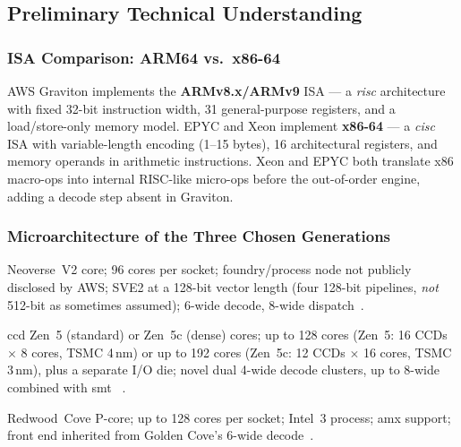 \documentclass[12pt,a4paper]{article}
\begin{document}
\subsection{Preliminary Technical Understanding}
\label{sec:tech}

\subsubsection*{ISA Comparison: ARM64 vs.\ x86-64}
AWS Graviton implements the \textbf{ARMv8.x/ARMv9} ISA --- a
\emph{\gls{risc}} architecture with fixed 32-bit
instruction width, 31 general-purpose registers, and a load/store-only
memory model. EPYC and Xeon implement \textbf{x86-64} --- a
\emph{\gls{cisc}} ISA with variable-length encoding (1--15
bytes), 16 architectural registers, and memory operands in arithmetic
instructions. Xeon and EPYC both translate x86 macro-ops into internal
RISC-like micro-ops before the out-of-order engine, adding a decode
step absent in Graviton.

\subsubsection*{Microarchitecture of the Three Chosen Generations}
\begin{description}[leftmargin=2em, itemsep=3pt]
  \item[AWS Graviton4 (2024)] Neoverse~V2 core; 96 cores per socket;
        foundry/process node not publicly disclosed by AWS; SVE2 at a
        128-bit vector length (four 128-bit pipelines, \emph{not} 512-bit
        as sometimes assumed); 6-wide decode, 8-wide
        dispatch~\cite{chipsandcheese_graviton4}.
  \item[AMD EPYC 9005 ``Turin'' (2024)] \gls{ccd}
        Zen~5 (standard) or Zen~5c (dense) cores; up to 128 cores
        (Zen~5: 16 CCDs $\times$ 8 cores, TSMC 4\,nm) or up to 192
        cores (Zen~5c: 12 CCDs $\times$ 16 cores, TSMC 3\,nm), plus a
        separate I/O die; novel dual 4-wide decode clusters, up to
        8-wide combined with \gls{smt}
        ~\cite{amdepyc,hothardware_turin,chipsandcheese_zen5}.
  \item[Intel Xeon 6900P ``Granite Rapids'' (2024)] Redwood~Cove
        P-core; up to 128 cores per socket; Intel~3 process;
        \gls{amx} support; front end inherited from
        Golden Cove's 6-wide decode~\cite{intelxeon,hothardware_xeon6}.
\end{description}
\end{document}
